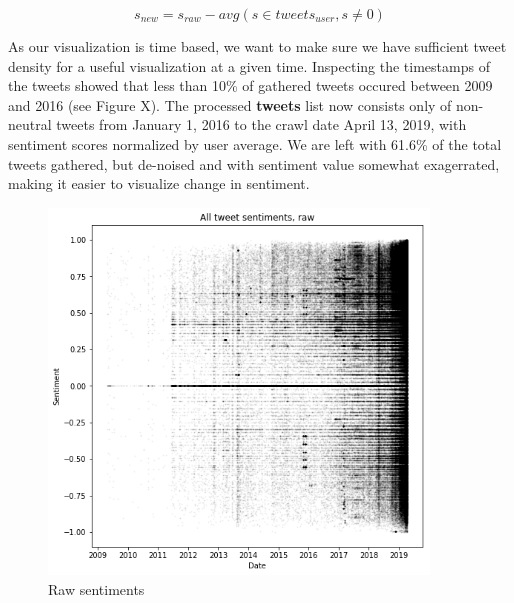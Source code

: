 \documentclass[12pt]{article}
\begin{document}
\[
    s_{new} = s_{raw} - avg(s\in tweets_{user}, s \neq 0)
\]

As our visualization is time based, we want to make sure we have sufficient tweet density for a useful visualization at a given time. Inspecting the timestamps of the tweets showed that less than 10\% of gathered tweets occured between 2009 and 2016 (see Figure X). The processed \textbf{tweets} list now consists only of non-neutral tweets from January 1, 2016 to the crawl date April 13, 2019, with sentiment scores normalized by user average. We are left with 61.6\% of the total tweets gathered, but de-noised and with sentiment value somewhat exagerrated, making it easier to visualize change in sentiment.

\begin{figure}[h!]
    \centering
    \begin{minipage}{0.45\textwidth}
        \centering
        \includegraphics[width=0.9\textwidth]{raw_sentiments} %
        \caption{Raw sentiments}
    \end{minipage}\hfill
    \begin{minipage}{0.45\textwidth}
        \centering

\end{minipage}
\end{figure}
\end{document}

